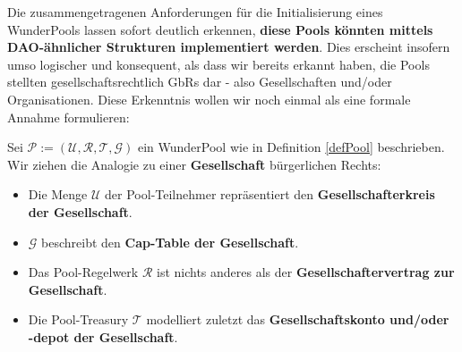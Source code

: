 \vspace{0.5cm}

Die zusammengetragenen Anforderungen für die Initialisierung eines WunderPools lassen sofort deutlich erkennen, \textbf{diese Pools könnten mittels DAO-ähnlicher Strukturen implementiert werden}. Dies erscheint insofern umso logischer und konsequent, als dass wir bereits erkannt haben, die Pools stellten gesellschaftsrechtlich GbRs dar - also Gesellschaften und/oder Organisationen. Diese Erkenntnis wollen wir noch einmal als eine formale Annahme formulieren: 

\vspace{0.3cm}

\begin{Assumption}
\label{assumptionGbR} 

Sei $\mathcal{P} := \left( \mathcal{U}, \mathcal{R}, \mathcal{T}, \mathcal{G} \right)$ ein WunderPool wie in Definition \ref{defPool} beschrieben. Wir ziehen die Analogie zu einer \textbf{Gesellschaft} bürgerlichen Rechts:

\begin{itemize}
	\item Die Menge $\mathcal{U}$ der Pool-Teilnehmer repräsentiert den \textbf{Gesellschafterkreis der Gesellschaft}.
	\item $\mathcal{G}$ beschreibt den \textbf{Cap-Table der Gesellschaft}.
	\item Das Pool-Regelwerk $\mathcal{R}$ ist nichts anderes als der \textbf{Gesellschaftervertrag zur Gesellschaft}.
	\item Die Pool-Treasury $\mathcal{T}$ modelliert zuletzt das \textbf{Gesellschaftskonto und/oder -depot der Gesellschaft}.
\end{itemize}

\end{Assumption}
 
\vspace{0.5cm}